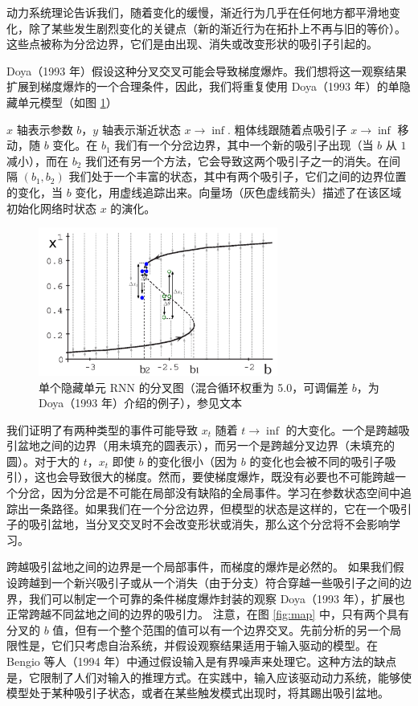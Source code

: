 动力系统理论告诉我们，随着变化的缓慢，渐近行为几乎在任何地方都平滑地变化，除了某些发生剧烈变化的关键点（新的渐近行为在拓扑上不再与旧的等价）。这些点被称为分岔边界，它们是由出现、消失或改变形状的吸引子引起的。

Doya（1993 年）假设这种分叉交叉可能会导致梯度爆炸。我们想将这一观察结果扩展到梯度爆炸的一个合理条件，因此，我们将重复使用 Doya（1993 年）的单隐藏单元模型（如图 \ref{fig:fork}）

\(x\) 轴表示参数 \(b\)，\(y\) 轴表示渐近状态 \(x\to\inf\). 粗体线跟随着点吸引子 \(x\to\inf\) 移动，随 \(b\) 变化。在 \(b_1\) 我们有一个分岔边界，其中一个新的吸引子出现（当 \(b\) 从 \(1\) 减小），而在 \(b_2\) 我们还有另一个方法，它会导致这两个吸引子之一的消失。在间隔 \((b_1, b_2)\) 我们处于一个丰富的状态，其中有两个吸引子，它们之间的边界位置的变化，当 \(b\) 变化，用虚线追踪出来。向量场（灰色虚线箭头）描述了在该区域初始化网络时状态 \(x\) 的演化。

\begin{figure}[htbp]
  \centering
  \includegraphics[width=0.7\textwidth]{figures/IMG_85238686FD5A-1.jpeg}
  \caption{单个隐藏单元 RNN 的分叉图（混合循环权重为 5.0，可调偏差 \(b\)，为
    Doya（1993 年）介绍的例子），参见文本}
  \label{fig:fork}
\end{figure}

我们证明了有两种类型的事件可能导致 \(x_t\) 随着 \(t\to\inf\) 的大变化。一个是跨越吸引盆地之间的边界（用未填充的圆表示），而另一个是跨越分叉边界（未填充的圆）。对于大的 \(t\)，\(x_t\) 即使 \(b\) 的变化很小（因为 \(b\) 的变化也会被不同的吸引子吸引），这也会导致很大的梯度。然而，要使梯度爆炸，既没有必要也不可能跨越一个分岔，因为分岔是不可能在局部没有缺陷的全局事件。学习在参数状态空间中追踪出一条路径。如果我们在一个分岔边界，但模型的状态是这样的，它在一个吸引子的吸引盆地，当分叉交叉时不会改变形状或消失，那么这个分岔将不会影响学习。

跨越吸引盆地之间的边界是一个局部事件，而梯度的爆炸是必然的。 如果我们假设跨越到一个新兴吸引子或从一个消失（由于分支）符合穿越一些吸引子之间的边界，我们可以制定一个可靠的条件梯度爆炸封装的观察 Doya（1993 年），扩展也正常跨越不同盆地之间的边界的吸引力。 注意，在图 \ref{fig:map} 中，只有两个具有分叉的 \(b\) 值，但有一个整个范围的值可以有一个边界交叉。先前分析的另一个局限性是，它们只考虑自治系统，并假设观察结果适用于输入驱动的模型。在 Bengio 等人（1994 年）中通过假设输入是有界噪声来处理它。这种方法的缺点是，它限制了人们对输入的推理方式。在实践中，输入应该驱动动力系统，能够使模型处于某种吸引子状态，或者在某些触发模式出现时，将其踢出吸引盆地。

